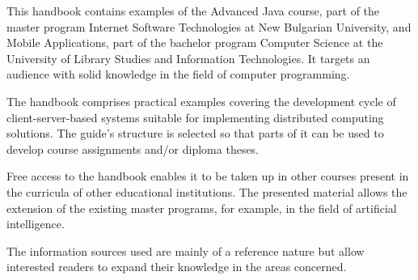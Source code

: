 This handbook contains examples of the Advanced Java course, part of the master program Internet Software Technologies at New Bulgarian University, and Mobile Applications, part of the bachelor program Computer Science at the University of Library Studies and Information Technologies. It targets an audience with solid knowledge in the field of computer programming.

The handbook comprises practical examples covering the development cycle of client-server-based systems suitable for implementing distributed computing solutions. The guide's structure is selected so that parts of it can be used to develop course assignments and/or diploma theses.

Free access to the handbook enables it to be taken up in other courses present in the curricula of other educational institutions. The presented material allows the extension of the existing master programs, for example, in the field of artificial intelligence.

The information sources used are mainly of a reference nature but allow interested readers to expand their knowledge in the areas concerned.

